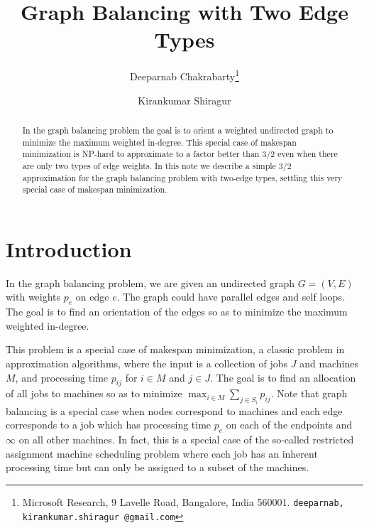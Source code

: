 \documentclass[11pt]{article}
\newcommand*\samethanks[1][\value{footnote}]{\footnotemark[#1]}
\begin{document}
\title{Graph Balancing with Two Edge Types }
\author{Deeparnab Chakrabarty\thanks{Microsoft Research, 9 Lavelle Road, Bangalore, India 560001. {\tt deeparnab, kirankumar.shiragur @gmail.com}} \and Kirankumar Shiragur\samethanks}\date{}
\maketitle
\begin{abstract}
	In the graph balancing problem the goal is to orient a weighted undirected graph to minimize the maximum weighted in-degree. This special case of makespan minimization is NP-hard to approximate to a factor better than $3/2$ even when there are only two types of edge weights. In this note we describe a simple $3/2$ approximation for the graph balancing problem with two-edge types, settling this very special case of makespan minimization.
\end{abstract}
\section{Introduction}
In the graph balancing problem, we are given an undirected graph $G=(V,E)$ with weights $p_e$ on edge $e$. The graph could have parallel edges and self loops. The goal is to find an orientation of the edges so as to minimize the maximum weighted in-degree. 

This problem is a special case of makespan minimization, a classic problem in approximation algorithms, where
the input is a collection of jobs $J$ and machines $M$, and processing time $p_{ij}$ for $i\in M$ and $j\in J$.
The goal is to find an allocation of all jobs to machines so as to minimize $\max_{i\in M} \sum_{j\in S_i} p_{ij}$. Note that graph balancing is a special case 
when nodes correspond to machines and each edge corresponds to a job which has processing time $p_e$ on each of the endpoints and $\infty$ on all other machines. In fact, this is a special case of the so-called restricted assignment machine scheduling problem where each job has an inherent processing time but can only be assigned to a subset of the machines.
\end{document}
